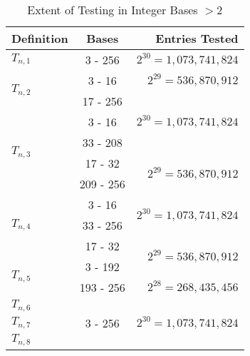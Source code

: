 \documentclass[conference]{IEEEtran}
\begin{document}
\renewcommand{\arraystretch}{1.25}
\begin{table}[H]
\label{tab:testing_bn}
\caption{Extent of Testing in Integer Bases $> 2$}
\centering
\begin{tabular}{|l|c|r|}
\hline
\textbf{Definition}       & \textbf{Bases}         & \textbf{Entries Tested}            \\\hline
$T_{n,1}$                 & 3 - 256                & $2^{30} = 1,073,741,824$           \\\hline
\multirow{2}{*}{$T_{n,2}$}& 3 - 16                 & $2^{29} = 536,870,912$             \\\cline{2-3}
                          & 17 - 256               &\multirow{3}{*}{$2^{30}=1,073,741,824$}\\\cline{1-2}
\multirow{4}{*}{$T_{n,3}$}& 3 - 16                 &                                    \\\cline{2-2} 
                          & 33 - 208               &                                    \\\cline{2-3} 
                          & 17 - 32                &\multirow{2}{*}{$2^{29}=536,870,912$}\\\cline{2-2}
                          & 209 - 256              &                                    \\\hline
\multirow{3}{*}{$T_{n,4}$}& 3 - 16                 &\multirow{2}{*}{$2^{30}=1,073,741,824$}\\\cline{2-2}
                          & 33 - 256               &                                    \\\cline{2-3}
                          & 17 - 32                &\multirow{2}{*}{$2^{29}=536,870,912$}\\\cline{1-2} 
\multirow{2}{*}{$T_{n,5}$}& 3 - 192                &                                    \\\cline{2-3}
                          & 193 - 256              & $2^{28} = 268,435,456$             \\\hline
$T_{n,6}$                 &\multirow{3}{*}{3 - 256}&\multirow{3}{*}{$2^{30}=1,073,741,824$}\\\cline{1-1}
$T_{n,7}$                 &                        &                                    \\\cline{1-1}
$T_{n,8}$                 &                        &                                    \\\hline
\end{tabular}
\end{table}
\end{document}
